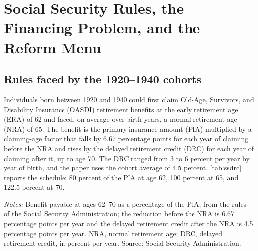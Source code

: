 \section{Social Security Rules, the Financing Problem, and the Reform Menu}\label{sec:institutions}

\subsection{Rules faced by the 1920--1940 cohorts}\label{subsec:rules}

Individuals born between 1920 and 1940 could first claim Old-Age, Survivors, and Disability Insurance (OASDI) retirement benefits at the early retirement age (ERA) of 62 and faced, on average over birth years, a normal retirement age (NRA) of 65. %
The benefit is the primary insurance amount (PIA) multiplied by a claiming-age factor that falls by 6.67 percentage points for each year of claiming before the NRA and rises by the delayed retirement credit (DRC) for each year of claiming after it, up to age 70. The DRC ranged from 3 to 6 percent per year by year of birth, and the paper uses the cohort average of 4.5 percent. %
\autoref{tab:ssdrc} reports the schedule: 80 percent of the PIA at age 62, 100 percent at 65, and 122.5 percent at 70. %

\begin{table}[!t]
\centering
\caption{Social Security Benefit as a Percentage of the Primary Insurance Amount by Claiming Age, 1920--1940 Cohorts (NRA 65, DRC 4.5 Percent)}
\label{tab:ssdrc}
\vspace{6pt}
\footnotesize
\begin{threeparttable}

\begin{tablenotes}[flushleft]\scriptsize
\item[] \textit{Notes:} Benefit payable at ages 62--70 as a percentage of the PIA, from the rules of the Social Security Administration; the reduction before the NRA is 6.67 percentage points per year and the delayed retirement credit after the NRA is 4.5 percentage points per year. NRA, normal retirement age; DRC, delayed retirement credit, in percent per year. Source: Social Security Administration.
\end{tablenotes}
\end{threeparttable}
\end{table}

